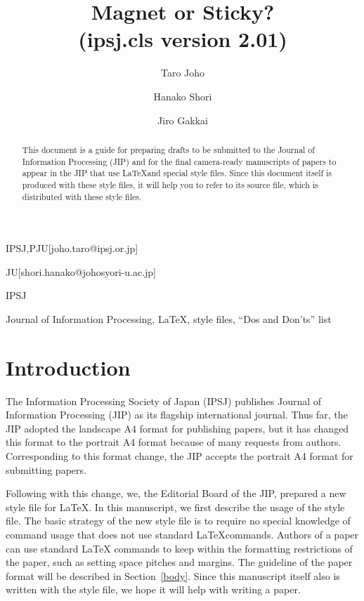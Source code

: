 \documentclass[english,preprint,JIP]{ipsj}
\begin{document}
\title{Magnet or Sticky?\\
(ipsj.cls version 2.01)}


\author{Taro Joho}{IPSJ,PJU}[joho.taro@ipsj.or.jp]
\author{Hanako Shori}{JU}[shori.hanako@johosyori-u.ac.jp]
\author{Jiro Gakkai}{IPSJ}


\begin{abstract}
This document is a guide for preparing drafts to be submitted to the
Journal of Information Processing (JIP) and for the final camera-ready
manuscripts of papers to appear in the JIP that use \LaTeX and special
style files.  Since this document itself is produced with these style
files, it will help you to refer to its source file, which is
distributed with these style files.
\end{abstract}

\begin{keyword}
Journal of Information Processing, \LaTeX, style files, ``Dos and
 Don'ts'' list
\end{keyword}

\maketitle

\section{Introduction}

The Information Processing Society of Japan (IPSJ) publishes Journal of
Information Processing (JIP) as its flagship international journal.
Thus far, the JIP adopted the landscape A4 format for publishing papers,
but it has changed this format to the portrait A4 format because of many
requests from authors.  Corresponding to this format change, the JIP
accepts the portrait A4 format for submitting papers.

Following with this change, we, the Editorial Board of the JIP, prepared
a new style file for \LaTeX\@.  In this manuscript, we first describe
the usage of the style file.  The basic strategy of the new style file
is to require no special knowledge of command usage that does not use
standard \LaTeX commands.  Authors of a paper can use standard \LaTeX
commands to keep within the formatting restrictions of the paper, such
as setting space pitches and margins.  The guideline of the paper format
will be described in Section~\ref{body}.  Since this manuscript itself
also is written with the style file, we hope it will help with writing a
paper.
\end{document}
